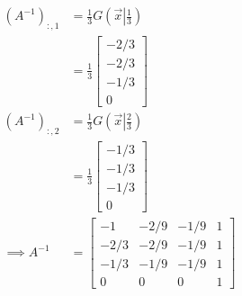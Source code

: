 \documentclass[]{article}
\begin{document}
        \begin{align*}\tag{4.b.4}\label{eqn:4.b.4}
            (A^{-1})_{:, 1} &= \frac{1}{3}
            G\left(\vec{x}\left|\frac{1}{3}\right.\right)
            \\
            &= \frac{1}{3}
            \begin{bmatrix}
                -2/3 \\ -2/3 \\ -1/3 \\ 0
            \end{bmatrix}
            \\
            (A^{-1})_{:, 2} &= \frac{1}{3}
            G\left(\vec{x}\left|\frac{2}{3}\right.\right)
            \\
            &= \frac{1}{3}\begin{bmatrix}
                -1/3\\ -1/3\\ -1/3\\ 0
            \end{bmatrix}
            \\
            \implies A^{-1} &= 
            \begin{bmatrix}
                -1 & -2/9 & -1/9 & 1\\
                -2/3 & -2/9 & -1/9 & 1\\ 
                -1/3 & -1/9& -1/9 & 1\\
                0 & 0 & 0 & 1
            \end{bmatrix}
        \end{align*}
\end{document}
